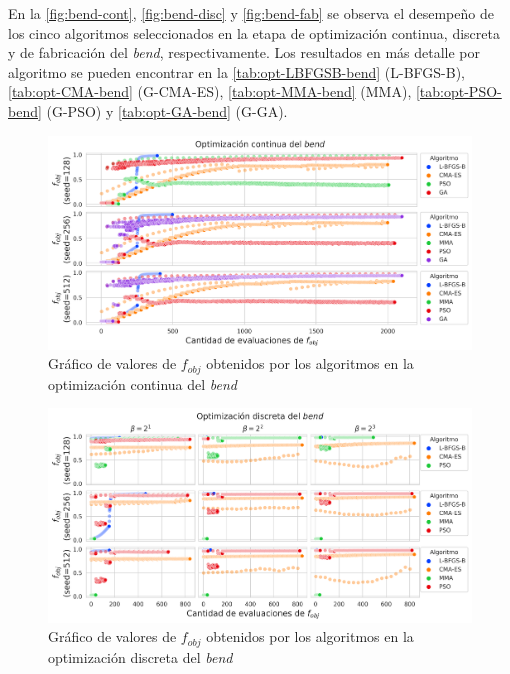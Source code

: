 
En la \autoref{fig:bend-cont}, \autoref{fig:bend-disc} y \autoref{fig:bend-fab} se observa 
el desempeño de los cinco algoritmos seleccionados en la etapa de optimización continua, discreta y
de fabricación del \emph{bend}, respectivamente.
Los resultados en más detalle por algoritmo se pueden encontrar en la 
\autoref{tab:opt-LBFGSB-bend} (L-BFGS-B),
\autoref{tab:opt-CMA-bend} (G-CMA-ES),
\autoref{tab:opt-MMA-bend} (MMA),
\autoref{tab:opt-PSO-bend} (G-PSO) y
\autoref{tab:opt-GA-bend} (G-GA).

\begin{landscape}
\begin{figure}[ht]
  \centering
  \includegraphics[scale=1.0]{image/results/bend/bend-opt-cont.png}
  \caption{Gráfico de valores de $f_{obj}$ obtenidos por los algoritmos en la optimización continua del \emph{bend}}
  \label{fig:bend-cont}
\end{figure}
\end{landscape}

\begin{landscape}
\begin{figure}[ht]
  \centering
  \includegraphics[scale=1.0]{image/results/bend/bend-opt-disc.png}
  \caption{Gráfico de valores de $f_{obj}$ obtenidos por los algoritmos en la optimización discreta del \emph{bend}}
  \label{fig:bend-disc}
\end{figure}
\end{landscape}

